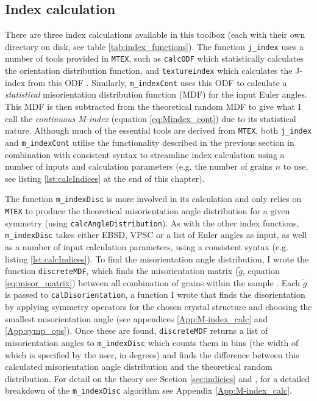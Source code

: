 \documentclass[a4paper,12pt,twoside]{report}
\numberwithin{equation}{chapter}
\begin{document}
\subsection{Index calculation} \label{sec:index_calc}

There are three index calculations available in this toolbox (each with their own directory on disk, see table \ref{tab:index_functions}). The function \texttt{j\_{}index} uses a number of tools provided in \texttt{MTEX},  such as \texttt{calcODF} which statistically calculates the orientation distribution function, and \texttt{textureindex} which calculates the J-index from this ODF \citep[for details on their method of ODF calculation see][]{Hielscher2008}. Similarly, \texttt{m\_{}indexCont} uses this ODF to calculate a \emph{statistical} misorientation distribution function (MDF) for the input Euler angles.  This MDF is then subtracted from the theoretical random MDF to give what I call the \emph{continuous M-index} (equation \ref{eq:Mindex_cont}) due to its statistical nature.  Although much of the essential tools are derived from \texttt{MTEX}, both \texttt{j\_{}index} and \texttt{m\_{}indexCont} utilise the functionality described in the previous section in combination with consistent syntax to streamline index calculation using a number of inputs and calculation parameters (e.g. the number of grains $n$ to use, see listing \ref{lst:calcIndices} at the end of this chapter).         

The function \texttt{m\_{}indexDisc} is more involved in its calculation and only relies on \texttt{MTEX} to produce the theoretical misorientation angle distribution for a given symmetry (using \texttt{calcAngleDistribution}). As with the other index functions, \texttt{m\_{}indexDisc} takes either EBSD, VPSC or a list of Euler angles as input, as well as a number of input calculation parameters, using a consistent syntax (e.g. listing \ref{lst:calcIndices}). To find the misorientation angle distribution, I wrote the function \texttt{discreteMDF}, which finds the misorientation matrix ($\tilde{g}$, equation \ref{eq:misor_matrix}) between all combination of grains within the sample \citep[uncorrelated misorientation angle distribution,][]{Mainprice}. Each $\tilde{g}$ is passed to \texttt{calDisorientation}, a function I wrote that finds the disorientation \citep{Grimmer1979} by applying symmetry operators for the chosen crystal structure and choosing the smallest misorientation angle (see appendices \ref{App:M-index_calc} and \ref{App:symp_ops}). Once these are found, \texttt{discreteMDF} returns a list of misorientation angles to \texttt{m\_{}indexDisc} which counts them in bins (the width of which is specified by the user, in degrees) and finds the difference between this calculated misorientation angle distribution and the theoretical random distribution. For detail on the theory see Section \ref{sec:indicies} and \cite{Skemer}, for a detailed breakdown of the \texttt{m\_{}indexDisc} algorithm see Appendix \ref{App:M-index_calc}.                                            
\end{document}
